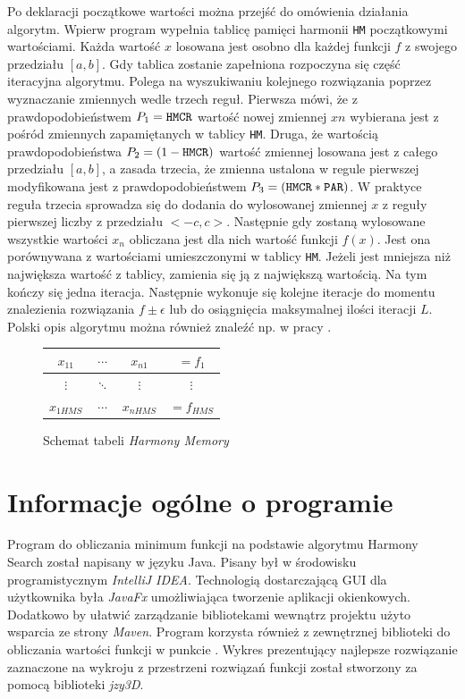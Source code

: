\documentclass[10pt, a4paper]{article}
\begin{document}
Po deklaracji początkowe wartości można przejść do omówienia działania algorytm. Wpierw program wypełnia tablicę pamięci harmonii {\tt HM} początkowymi wartościami. Każda wartość $x$ losowana jest osobno dla każdej funkcji $f$ z swojego przedziału $[a,b]$. Gdy tablica zostanie zapełniona rozpoczyna się część iteracyjna algorytmu. Polega na wyszukiwaniu kolejnego rozwiązania poprzez wyznaczanie zmiennych wedle trzech reguł. Pierwsza mówi, że z prawdopodobieństwem $P_{1}={\tt HMCR}$ wartość nowej zmiennej $x{n}$ wybierana jest z pośród zmiennych zapamiętanych w tablicy {\tt HM}. Druga, że wartością prawdopodobieństwa $P_{2}=(1-{\tt HMCR})$ wartość zmiennej losowana jest z całego przedziału $[a,b]$, a zasada trzecia, że zmienna ustalona w regule pierwszej modyfikowana jest z prawdopodobieństwem $P_{3}=({\tt HMCR}*{\tt PAR})$. W praktyce reguła trzecia sprowadza się do dodania do wylosowanej zmiennej $x$ z reguły pierwszej liczby z przedziału $<-c,c>$. Następnie gdy zostaną wylosowane wszystkie wartości $x_{n}$ obliczana jest dla nich wartość funkcji $f(x)$. Jest ona porównywana z wartościami umieszczonymi w tablicy {\tt HM}. Jeżeli jest mniejsza niż największa wartość z tablicy, zamienia się ją z największą wartością. Na tym kończy się jedna iteracja. Następnie wykonuje się kolejne iteracje do momentu znalezienia rozwiązania $f \pm \epsilon$ lub do osiągnięcia maksymalnej ilości iteracji {\em $L$}. Polski opis algorytmu można również znaleźć np. w pracy \cite{bib:tlumaczenie}.
\begin{figure}[h]
\begin{tabular}{|ccc|c|}
	\hline 
	$x_{11}$ & $\cdots$ & $x_{n1}$ & $=f_{1}$\\ 
	\hline 
	$\vdots$ & $\ddots$ & $\vdots$ & $\vdots$\\ 
	\hline 
	$x_{1HMS}$ & $\cdots$ & $x_{nHMS}$ & $=f_{HMS}$\\ 
	\hline 
\end{tabular}
	\centering
	\caption{Schemat tabeli {\em Harmony Memory}}
	\label{tab:1}
\end{figure}

\section{Informacje ogólne o programie}
\label{sec:implementacja}
Program do obliczania minimum funkcji na podstawie algorytmu Harmony Search został napisany w języku Java. Pisany był w środowisku programistycznym {\em IntelliJ IDEA}. Technologią dostarczającą GUI dla użytkownika była {\em JavaFx} umożliwiająca tworzenie aplikacji okienkowych. Dodatkowo by ułatwić zarządzanie bibliotekami wewnątrz projektu użyto wsparcia ze strony {\em Maven}.  Program korzysta również z zewnętrznej biblioteki do obliczania wartości funkcji w punkcie \cite{bib:mathparser}. Wykres prezentujący najlepsze rozwiązanie zaznaczone na wykroju z przestrzeni rozwiązań funkcji został stworzony za pomocą biblioteki {\em jzy3D}.
\end{document}
